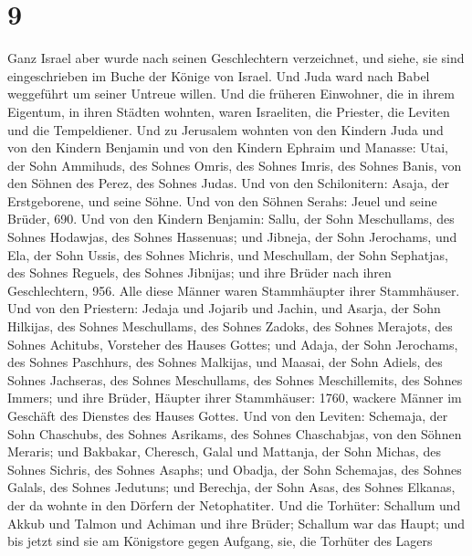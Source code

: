 \hypertarget{section-8}{%
\section{9}\label{section-8}}

 Ganz Israel aber wurde nach seinen Geschlechtern
verzeichnet, und siehe, sie sind eingeschrieben im Buche der Könige von
Israel. Und Juda ward nach Babel weggeführt um seiner Untreue willen.
 Und die früheren Einwohner, die in ihrem Eigentum, in
ihren Städten wohnten, waren Israeliten, die Priester, die Leviten und
die Tempeldiener.  Und zu Jerusalem wohnten von den
Kindern Juda und von den Kindern Benjamin und von den Kindern Ephraim
und Manasse:  Utai, der Sohn Ammihuds, des Sohnes Omris,
des Sohnes Imris, des Sohnes Banis, von den Söhnen des Perez, des Sohnes
Judas.  Und von den Schilonitern: Asaja, der Erstgeborene,
und seine Söhne.  Und von den Söhnen Serahs: Jeuel und
seine Brüder, 690.  Und von den Kindern Benjamin: Sallu,
der Sohn Meschullams, des Sohnes Hodawjas, des Sohnes Hassenuas;
 und Jibneja, der Sohn Jerochams, und Ela, der Sohn Ussis,
des Sohnes Michris, und Meschullam, der Sohn Sephatjas, des Sohnes
Reguels, des Sohnes Jibnijas;  und ihre Brüder nach ihren
Geschlechtern, 956. Alle diese Männer waren Stammhäupter ihrer
Stammhäuser.  Und von den Priestern: Jedaja und Jojarib
und Jachin, und Asarja,  der Sohn Hilkijas, des Sohnes
Meschullams, des Sohnes Zadoks, des Sohnes Merajots, des Sohnes
Achitubs, Vorsteher des Hauses Gottes;  und Adaja, der
Sohn Jerochams, des Sohnes Paschhurs, des Sohnes Malkijas, und Maasai,
der Sohn Adiels, des Sohnes Jachseras, des Sohnes Meschullams, des
Sohnes Meschillemits, des Sohnes Immers;  und ihre
Brüder, Häupter ihrer Stammhäuser: 1760, wackere Männer im Geschäft des
Dienstes des Hauses Gottes.  Und von den Leviten:
Schemaja, der Sohn Chaschubs, des Sohnes Asrikams, des Sohnes
Chaschabjas, von den Söhnen Meraris;  und Bakbakar,
Cheresch, Galal und Mattanja, der Sohn Michas, des Sohnes Sichris, des
Sohnes Asaphs;  und Obadja, der Sohn Schemajas, des
Sohnes Galals, des Sohnes Jedutuns; und Berechja, der Sohn Asas, des
Sohnes Elkanas, der da wohnte in den Dörfern der Netophatiter.
 Und die Torhüter: Schallum und Akkub und Talmon und
Achiman und ihre Brüder; Schallum war das Haupt;  und bis
jetzt sind sie am Königstore gegen Aufgang, sie, die Torhüter des Lagers
